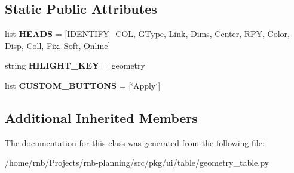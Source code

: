 \subsection*{Static Public Attributes}
\begin{DoxyCompactItemize}
\item 
\mbox{\label{classrnb-planning_1_1src_1_1pkg_1_1ui_1_1table_1_1geometry__table_1_1_geometry_table_a59558c5d720567b79d185a7fb0af1a4f}} 
list {\bfseries H\+E\+A\+DS} = \mbox{[}I\+D\+E\+N\+T\+I\+F\+Y\+\_\+\+C\+OL, \textquotesingle{}G\+Type\textquotesingle{}, \textquotesingle{}Link\textquotesingle{}, \textquotesingle{}Dims\textquotesingle{}, \textquotesingle{}Center\textquotesingle{}, \textquotesingle{}R\+PY\textquotesingle{}, \textquotesingle{}Color\textquotesingle{}, \textquotesingle{}Disp\textquotesingle{}, \textquotesingle{}Coll\textquotesingle{}, \textquotesingle{}Fix\textquotesingle{}, \textquotesingle{}Soft\textquotesingle{}, \textquotesingle{}Online\textquotesingle{}\mbox{]}
\item 
\mbox{\label{classrnb-planning_1_1src_1_1pkg_1_1ui_1_1table_1_1geometry__table_1_1_geometry_table_a28aae67c0a68c24d2e00d17fe2151b19}} 
string {\bfseries H\+I\+L\+I\+G\+H\+T\+\_\+\+K\+EY} = \textquotesingle{}geometry\textquotesingle{}
\item 
\mbox{\label{classrnb-planning_1_1src_1_1pkg_1_1ui_1_1table_1_1geometry__table_1_1_geometry_table_a6d7b5b5092974043eacfaa3c3b308f83}} 
list {\bfseries C\+U\+S\+T\+O\+M\+\_\+\+B\+U\+T\+T\+O\+NS} = \mbox{[}\char`\"{}Apply\char`\"{}\mbox{]}
\end{DoxyCompactItemize}
\subsection*{Additional Inherited Members}


The documentation for this class was generated from the following file\+:\begin{DoxyCompactItemize}
\item 
/home/rnb/\+Projects/rnb-\/planning/src/pkg/ui/table/geometry\+\_\+table.\+py\end{DoxyCompactItemize}
